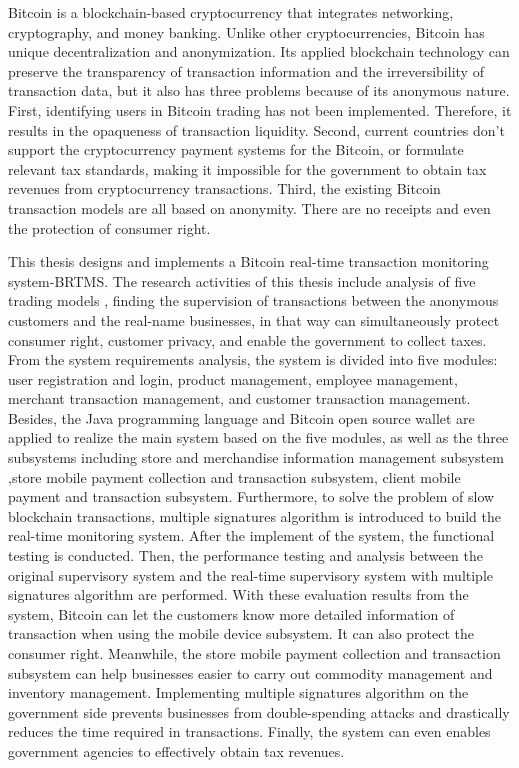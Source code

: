 \begin{eabstract}
	Bitcoin is a blockchain-based cryptocurrency that integrates networking, cryptography, and money banking. Unlike other cryptocurrencies, Bitcoin has unique decentralization and anonymization. Its applied blockchain technology can preserve the transparency of transaction information and the irreversibility of transaction data, but it also has three problems because of its anonymous nature. First, identifying users in Bitcoin trading has not been implemented. Therefore, it results in the opaqueness of transaction liquidity. Second, current countries don't support the cryptocurrency payment systems for the Bitcoin, or formulate relevant tax standards, making it impossible for the government to obtain tax revenues from cryptocurrency transactions. Third, the existing Bitcoin transaction models are all based on anonymity. There are no receipts and even the protection of consumer right.

	This thesis designs and implements a Bitcoin real-time transaction monitoring system-BRTMS. The research activities of this thesis include analysis of five trading models , finding the supervision of transactions between the anonymous customers and the real-name businesses, in that way can simultaneously protect consumer right, customer privacy, and enable the government to collect taxes. From the system requirements analysis, the system is divided into five modules: user registration and login, product management, employee management, merchant transaction management, and customer transaction management. Besides, the Java programming language and Bitcoin open source wallet are applied to realize the main system based on the five modules, as well as the three subsystems including store and merchandise information management subsystem ,store mobile payment collection and transaction subsystem, client mobile payment and transaction subsystem. Furthermore, to solve the problem of slow blockchain transactions, multiple signatures algorithm is introduced to build the real-time monitoring system. After the implement of the system, the functional testing is conducted. Then, the performance testing and analysis between the original supervisory system and the real-time supervisory system with multiple signatures algorithm are performed. With these evaluation results from the system, Bitcoin can let the customers know  more detailed information of transaction when using the mobile device subsystem. It can also protect the consumer right. Meanwhile, the store mobile payment collection and transaction subsystem can help businesses easier to carry out commodity management and inventory management. Implementing multiple signatures algorithm on the government side prevents businesses from double-spending attacks and drastically reduces the time required in transactions. Finally, the system can even enables government agencies to effectively obtain tax revenues.


\end{eabstract}

